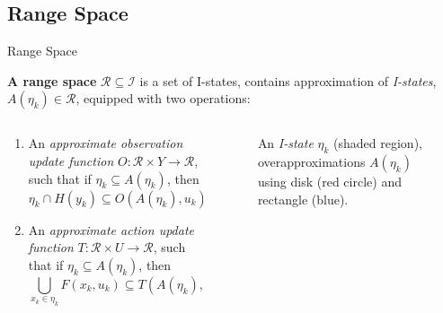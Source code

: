 \subsection[Range Space]{Range Space}
\begin{frame}{Range Space}
  \begin{definition}{\textbf{A range space}}
    $\mathcal{R} \subseteq \mathcal{I}$ is a set of I-states, contains
    approximation of \emph{I-states}, $A(\eta_k) \in \mathcal{R}$, equipped with
    two operations:
  \end{definition}
  \begin{columns}
    \begin{column}{.5\textwidth}
      \begin{enumerate}
      \item An \emph{approximate observation update function} $O: \mathcal{R} \times
        Y \to \mathcal{R}$, such that if $\eta_k \subseteq A(\eta_k)$, then
        $$\eta_k \cap H(y_k) \subseteq O(A(\eta_k), u_k)$$
      \item An \emph{approximate action update function} $T: \mathcal{R} \times U \to
        \mathcal{R}$, such that if $\eta_k \subseteq A(\eta_k)$, then
        $$\bigcup_{x_k \in \eta_k} F(x_k, u_k) \subseteq T(A(\eta_k), u_k)$$
      \end{enumerate}
    \end{column}
    \begin{column}{.4\textwidth}
    \begin{figure}
    \caption{\scriptsize{An \emph{I-state} $\eta_k$ (shaded region),
        overapproximations $A(\eta_k)$ using disk (red circle) and rectangle
        (blue). }}
    \end{figure}
  \end{column}
\end{columns}
\end{frame}


